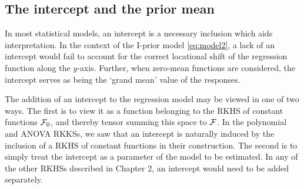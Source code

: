 %
%
%


\subsection{The intercept and the prior mean}\label{sec:intercept}

In most statistical models, an intercept is a necessary inclusion which aids interpretation.
In the context of the I-prior model \eqref{eq:model2}, a lack of an intercept would fail to account for the correct locational shift of the regression function along the $y$-axis.
Further, when zero-mean functions are considered, the intercept serves as being the `grand mean' value of the responses.

The addition of an intercept to the regression model may be viewed in one of two ways.
The first is to view it as a function belonging to the RKHS of constant functions ${\mathcal F}_0$, and thereby tensor summing this space to ${\mathcal F}$.
In the polynomial and ANOVA RKKSs, we saw that an intercept is naturally induced by the inclusion of a RKHS of constant functions in their construction.
The second is to simply treat the intercept as a parameter of the model to be estimated.
In any of the other RKHSs described in Chapter 2, an intercept would need to be added separately.

